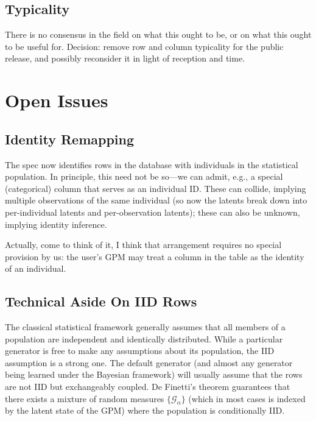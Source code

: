 \documentclass[10pt,letterpaper]{article}
\newcommand{\set}[1]{\{#1\}}
\newcommand{\G}{\mathcal{G}}
\begin{document}
\subsection{Typicality}

There is no consensus in the field on what this ought to be, or on
what this ought to be useful for.  Decision: remove row and column
typicality for the public release, and possibly reconsider it in light
of reception and time.

\section{Open Issues}

\subsection{Identity Remapping}

The spec now identifies rows in the database with individuals in
the statistical population.  In principle, this need not be so---we can admit, e.g.,
a special (categorical) column that serves as an individual ID.  These can collide,
implying multiple observations of the same individual (so now the latents break
down into per-individual latents and per-observation latents); these can also be unknown,
implying identity inference.

Actually, come to think of it, I think that arrangement requires no
special provision by us: the user's GPM may treat a column in the
table as the identity of an individual.


\subsection{Technical Aside On IID Rows}


The classical statistical framework generally assumes that all members of a
population are independent and identically
distributed.   While a particular
generator is free to make any assumptions about its population, the IID
assumption is a strong one. The default generator (and almost any generator
being learned under the Bayesian framework) will usually assume that the rows
are not IID but exchangeably coupled. De Finetti's theorem guarantees that there
exists a mixture of random measures $\set{\G_\alpha}$ (which in most
cases is indexed by the latent state of the GPM) where the population is
conditionally IID.
\end{document}
